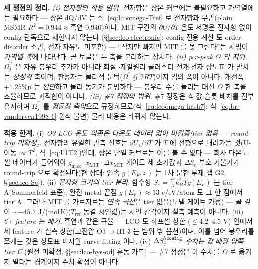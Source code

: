 \medskip
\textbf{세 쟁점의 정리.} \emph{(i) 전자항의 작용 범위.} 전자항은 상온 커브에는 불필요하고 가역열에는 필요하다 ---
상온 dQ/dV 는 식~\eqref{eq:lcoomega-Tref} 로 전자항과 무관(plain MSMR $R^2{=}0.944\!\approx\!$흑연
$0.940$)하나, MIT 구간의 $\partial U/\partial T$ 온도 서명은 전자항 없이 config 단독으로 재현되지 않는다
(\S\ref{sec:lco-electronic}: config 전용 계산\cite{ml2024} 도 order--disorder 소관, 전자 자유도 미포함) --- ``작지만
빠지면 MIT 를 못 그린다''는 서명이 \emph{가역열 축}에 나타난다. 곧 토글은 두 축을 분리하는 장치다.
\emph{(ii) per-peak $\Omega$ 의 지위.} $\Omega_j^\cat$ 은 자유 봉우리 추가가 아니라 회절
\cite{reimers1992}$\cdot$제일원리 클러스터 전개\cite{vanderven1998}$\cdot$전자 상도표\cite{motohashi2009} 가
받치는 \emph{상성격} 축이며, 판정자는 물리적 문턱($\Omega_j^\cat\!\lessgtr\!2RT$)이지 임의 폭이 아니다. 개선폭
$+1.25\%$p 는 \emph{완만}하고 물리 동기가 분명하다 --- 봉우리 수를 늘리는 대신 $\Omega$ 한 축을 조율하므로 과적합이 아니다.
\emph{(iii) \#7 정정의 범위.} \#7 정정은 식$\cdot$값$\cdot$슬롯 배치를 전부 유지하며 $\Omega_j^\cat$ 를
\emph{평균장 축약}으로 규정하므로(식~\eqref{eq:lcoomega-hash7}; 식~\eqref{eq:br-vanderven1998-1} 원식 불변) 물리
내용은 바뀌지 않는다.

\begin{warnbox}
\textbf{적용 한계.} (i) \emph{O3-LCO 온도 의존은 다온도 데이터 없이 미검증(tier 없음 --- round-trip 미확정).}
전자항의 유일한 관측 신호는 $\partial U_1/\partial T$ 가 $T$ 에 선형으로 내려가는 것(U-이동 $\propto T^2$,
식~\eqref{eq:U1T2})인데, 상온 단일 커브로는 이를 볼 수 없다 --- 회사 다온도 셀 데이터가 들어와야
$g_{\max}\cdot x_\mathrm{MIT}\cdot\Delta x_\mathrm{MIT}$ 게이트 세 초기값과 $\Delta S_e$ 부호$\cdot$기울기가
round-trip 으로 확정된다(현 상태: 연속 $g(E_F,x)$ 는 1차 문헌 부재 갭 G2, \S\ref{sec:lco-Se}). (ii) \emph{전자항
크기의 tier 분리.} 함수형 $S_e{=}\tfrac{\pi^2}{3}k_B^2Tg(E_F)$ 는 tier A(Sommerfeld 표준), 완전 metal 끝점
$g(E_F)\!\approx\!13$ e/eV/atom 도 그 한 점에서 tier A\cite{motohashi2009}, 그러나 MIT 를 가로지르는 \emph{연속
곡선}은 tier 없음(모델 게이트 가정) --- 골 깊이 $\sim-45.7$ J/(mol\,K)($T_\mathrm{ref}$ 동결 시연값)는 시연
감각이지 실측 예측이 아니다. (iii) \emph{6+ feature 는 폐기.} 흑연과 같은 규율 --- LCO 도 하프셀 상한
($\le$4.2--4.5 V) 안에서 세 feature 가 실측 상한(고전압 O3$\to$H1-3 는 범위 밖 옵션)이며, 이를 넘어 봉우리를
쪼개는 것은 상도표 미지원 curve-fitting 이다. (iv) \emph{$\Delta S_j^\config$ 수치는 값$\cdot$배정 양쪽 tier C}
(원전 미확정, \S\ref{sec:lco-hys-od} 혼동 가드) --- \#7 정정은 이 수치를 $\Omega$ 로 옮기지 말라는 경계이지
수치 확정이 아니다.
\end{warnbox}

